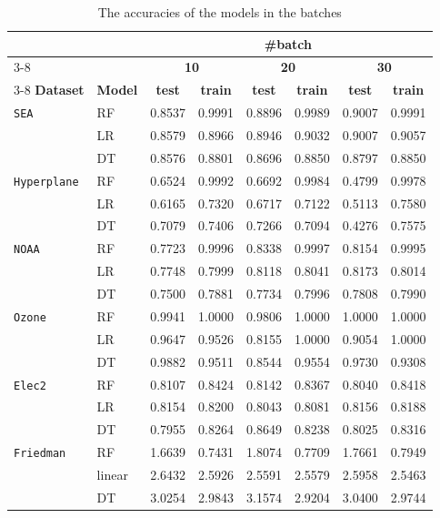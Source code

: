 \documentclass[pdflatex,sn-mathphys-ay]{sn-jnl}%
\theoremstyle{thmstyleone}%
\theoremstyle{thmstyletwo}%
\theoremstyle{thmstylethree}%
\begin{document}
\begin{table}[h]
    \centering
    \scriptsize
    \caption{The accuracies of the models in the batches}
    \label{tab:acc_batch}
    \begin{tabular}{llcccccc}\toprule
    & & \multicolumn{6}{c}{\textbf{\#batch}}\\
    \cmidrule(lr){3-8}
    & & \multicolumn{2}{c}{\textbf{10}} & \multicolumn{2}{c}{\textbf{20}} & \multicolumn{2}{c}{\textbf{30}} \\
    \cmidrule(lr){3-8}
    \textbf{Dataset} & \textbf{Model} & \textbf{test} & \textbf{train} & \textbf{test} & \textbf{train} & \textbf{test} & \textbf{train} \\
    \midrule
    \texttt{SEA} & RF & 0.8537 & 0.9991 & 0.8896 & 0.9989 & 0.9007 & 0.9991 \\
                          & LR & 0.8579 & 0.8966 & 0.8946 & 0.9032 & 0.9007 & 0.9057 \\
                          & DT & 0.8576 & 0.8801 & 0.8696 & 0.8850 & 0.8797 & 0.8850 \\
    \midrule
    \texttt{Hyperplane} & RF & 0.6524 & 0.9992 & 0.6692 & 0.9984 & 0.4799 & 0.9978 \\
                          & LR & 0.6165 & 0.7320 & 0.6717 & 0.7122 & 0.5113 & 0.7580 \\
                          & DT & 0.7079 & 0.7406 & 0.7266 & 0.7094 & 0.4276 & 0.7575 \\
    \midrule
    \texttt{NOAA} & RF & 0.7723 & 0.9996 & 0.8338 & 0.9997 & 0.8154 & 0.9995 \\
                          & LR & 0.7748 & 0.7999 & 0.8118 & 0.8041 & 0.8173 & 0.8014 \\
                          & DT & 0.7500 & 0.7881 & 0.7734 & 0.7996 & 0.7808 & 0.7990 \\
    \midrule
    \texttt{Ozone} & RF & 0.9941 & 1.0000 & 0.9806 & 1.0000 & 1.0000 & 1.0000 \\
                          & LR & 0.9647 & 0.9526 & 0.8155 & 1.0000 & 0.9054 & 1.0000 \\
                          & DT & 0.9882 & 0.9511 & 0.8544 & 0.9554 & 0.9730 & 0.9308 \\
    \midrule
    \texttt{Elec2} & RF & 0.8107 & 0.8424 & 0.8142 & 0.8367 & 0.8040 & 0.8418 \\
                          & LR & 0.8154 & 0.8200 & 0.8043 & 0.8081 & 0.8156 & 0.8188 \\
                          & DT & 0.7955 & 0.8264 & 0.8649 & 0.8238 & 0.8025 & 0.8316 \\
    \midrule
    \texttt{Friedman} & RF & 1.6639 & 0.7431 & 1.8074 & 0.7709 & 1.7661 & 0.7949 \\
                          & linear & 2.6432 & 2.5926 & 2.5591 & 2.5579 & 2.5958 & 2.5463 \\
                          & DT & 3.0254 & 2.9843 & 3.1574 & 2.9204 & 3.0400 & 2.9744 \\
    \midrule
    \end{tabular}
\end{table}
\end{document}
